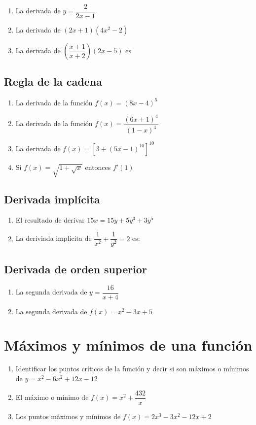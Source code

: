 \documentclass[10pt,a4paper]{article}
\begin{document}
\begin{multicols*}{2}
	\begin{enumerate}
		\item La derivada de $y = \dfrac{2}{2x-1}$
		\item La derivada de $(2x+1)(4x^2-2)$
		\item La derivada de $\left(\dfrac{x+1}{x+2}\right)(2x-5)$ es
	\end{enumerate}
	
	
	\subsection{Regla de la cadena}
	\begin{enumerate}
		\item La derivada de la función $f(x) = (8x-4)^5$
		\item La derivada de la función $f(x) = \dfrac{(6x+1)^4}{(1-x)^4}$
		\item La derivada de $f(x) = [3+(5x-1)^10]^10$
		\item Si $f(x) = \sqrt{1+ \sqrt{x}}$ entonces $f'(1)$
	\end{enumerate}
	
	\subsection{Derivada implícita}
	\begin{enumerate}
		\item El resultado de derivar $15x = 15y+5y^3 + 3y^5$
		\item La deriviada implícita de $\dfrac{1}{x^2}+\dfrac{1}{y^2}= 2$ es:
	\end{enumerate}
	
	\subsection{Derivada de orden superior}
	
	\begin{enumerate}
		\item La segunda derivada de $y = \dfrac{16}{x+4}$
		\item La segunda derivada de $f(x) = x^2-3x+5$
	\end{enumerate}
	
	 \section{Máximos y mínimos de una función}
		\begin{enumerate}
		\item Identificar los puntos críticos de la función y decir si son máximos o mínimos de $y = x^2-6x^2+12x-12$
		\item El máximo o mínimo de $f(x) = x^2+\dfrac{432}{x}$
		\item Los puntos máximos y mínimos de $f(x) = 2x^3-3x^2-12x+2$
	\end{enumerate}
	
\end{multicols*}
\end{document}

